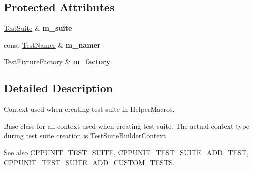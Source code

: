 \subsection*{Protected Attributes}
\begin{DoxyCompactItemize}
\item 
\hypertarget{class_test_suite_builder_context_base_a2bc6c31e3c209e36a044803575b8edb9}{\hyperlink{class_test_suite}{Test\+Suite} \& {\bfseries m\+\_\+suite}}\label{class_test_suite_builder_context_base_a2bc6c31e3c209e36a044803575b8edb9}

\item 
\hypertarget{class_test_suite_builder_context_base_a211acb226f0efb9fe020578da98904f6}{const \hyperlink{class_test_namer}{Test\+Namer} \& {\bfseries m\+\_\+namer}}\label{class_test_suite_builder_context_base_a211acb226f0efb9fe020578da98904f6}

\item 
\hypertarget{class_test_suite_builder_context_base_a8f0273a87e93a8c85df1277391d5df6d}{\hyperlink{class_test_fixture_factory}{Test\+Fixture\+Factory} \& {\bfseries m\+\_\+factory}}\label{class_test_suite_builder_context_base_a8f0273a87e93a8c85df1277391d5df6d}

\end{DoxyCompactItemize}


\subsection{Detailed Description}
Context used when creating test suite in Helper\+Macros. 

Base class for all context used when creating test suite. The actual context type during test suite creation is \hyperlink{class_test_suite_builder_context}{Test\+Suite\+Builder\+Context}.

\begin{DoxySeeAlso}{See also}
\hyperlink{group___writing_test_fixture_gabe1e12200f40d6f25d60c1783c99da81}{C\+P\+P\+U\+N\+I\+T\+\_\+\+T\+E\+S\+T\+\_\+\+S\+U\+I\+T\+E}, \hyperlink{group___writing_test_fixture_gaace55a4a3a4f3e0cd219d38e98d4f48f}{C\+P\+P\+U\+N\+I\+T\+\_\+\+T\+E\+S\+T\+\_\+\+S\+U\+I\+T\+E\+\_\+\+A\+D\+D\+\_\+\+T\+E\+S\+T}, \hyperlink{group___writing_test_fixture_ga516fec19cd7a7acb6fbf194bd98c4c09}{C\+P\+P\+U\+N\+I\+T\+\_\+\+T\+E\+S\+T\+\_\+\+S\+U\+I\+T\+E\+\_\+\+A\+D\+D\+\_\+\+C\+U\+S\+T\+O\+M\+\_\+\+T\+E\+S\+T\+S}. 
\end{DoxySeeAlso}


